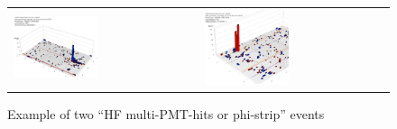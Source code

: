 %
\begin{figure}[h]
 \centering
 \begin{tabular}{ll}
   \includegraphics[width=0.47\textwidth]{fig/HFmultiHits.eps} &
   \includegraphics[width=0.47\textwidth]{fig/HFmultiHits_2.eps} \\
 \end{tabular}
\caption{Example of two ``HF multi-PMT-hits or phi-strip'' events}
\label{fig:HFmultiHits}
\end{figure}

